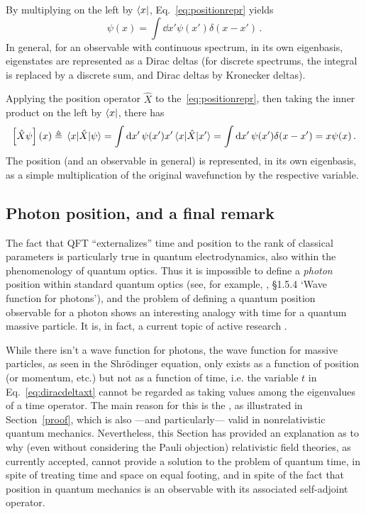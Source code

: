 By multiplying on the left by $\bra{x}$, Eq.~\eqref{eq:positionrepr} yields
\begin{equation}\label{eq:diracdeltax}
  \psi(x) = \int \dd{x'} \psi(x') \delta(x-x') \,\text{.}
\end{equation}
In general, for an observable with continuous spectrum,
in its own eigenbasis, eigenstates are represented as a Dirac deltas
(for discrete spectrums, the integral is replaced by a discrete sum,
and Dirac deltas by Kronecker deltas).

Applying the position operator $\hat{X}$ to the~\eqref{eq:positionrepr},
then taking the inner product on the left by $\bra{x}$,
there has
\begin{equation}
  \qty[\hat{X}\psi](x) \triangleq \mel{x}{\hat{X}}{\psi} =
    \int \dd{x'} \psi(x') x' \mel{x}{\hat{X}}{x'} =
    \int \dd{x'} \psi(x') \delta(x-x') =
    x\psi(x)
  \,\text{.}
\end{equation}
The position
(and an observable in general) is represented, in its own eigenbasis,
as a simple multiplication of the original wavefunction by the respective variable.

\subsection{Photon position, and a final remark}

The fact that QFT ``externalizes'' time and position to the rank of classical parameters
is particularly true in quantum electrodynamics, also within the
phenomenology of quantum optics.
Thus it is impossible to define a \emph{photon} position
within standard quantum optics (see, for example, \cite{ScullyZubairy}, \S 1.5.4 `Wave function for photons'),
and the problem of defining a quantum position observable for a photon
shows an interesting analogy with time for a quantum massive particle.
It is, in fact, a current topic of active research \parencite{HawtonPhotonPosition, Hawton2019}.

While there isn't a wave function for photons, the wave function for massive particles,
as seen in the Shr\"{o}dinger equation, only exists as a function of position (or momentum, etc.)
but not as a function of time,
i.e. the variable $t$ in Eq.~\eqref{eq:diracdeltaxt} cannot be regarded as taking values among the eigenvalues of a time operator.
The main reason for this is the , as illustrated in Section~\ref{proof},
which is also ---and particularly--- valid in nonrelativistic quantum mechanics. Nevertheless, this Section
has provided an explanation as to why (even without considering the Pauli objection)
relativistic field theories, as currently accepted, cannot provide a solution
to the problem of quantum time, in spite of treating time and space on equal footing,
and in spite of the fact that position in quantum mechanics is an observable
with its associated self-adjoint operator.
